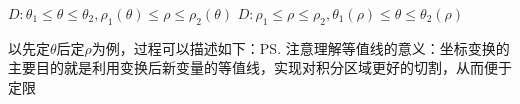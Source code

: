 \begin{center}
	\hspace{2cm}
	
	$D:\theta_1\leq\theta\leq\theta_2,\rho_1(\theta)\leq\rho\leq\rho_2(\theta)$
	\hspace{2cm}
	$D:\rho_1\leq\rho\leq\rho_2,\theta_1(\rho)\leq\theta\leq\theta_2(\rho)$
\end{center}

以先定$\theta$后定$\rho$为例，过程可以描述如下：\ps{注意理解等值线的意义：坐标变换的
主要目的就是利用变换后新变量的等值线，实现对积分区域更好的切割，从而便于定限}

